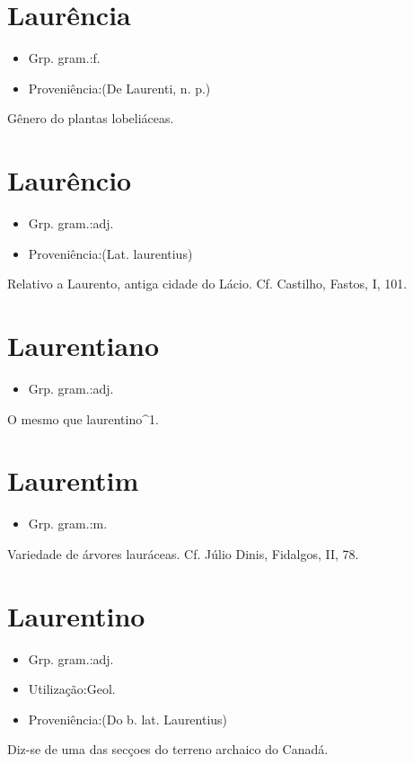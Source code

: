 \section{Laurência}
\begin{itemize}
\item {Grp. gram.:f.}
\end{itemize}
\begin{itemize}
\item {Proveniência:(De \textunderscore Laurenti\textunderscore , n. p.)}
\end{itemize}
Gênero do plantas lobeliáceas.
\section{Laurêncio}
\begin{itemize}
\item {Grp. gram.:adj.}
\end{itemize}
\begin{itemize}
\item {Proveniência:(Lat. \textunderscore laurentius\textunderscore )}
\end{itemize}
Relativo a Laurento, antiga cidade do Lácio. Cf. Castilho, \textunderscore Fastos\textunderscore , I, 101.
\section{Laurentiano}
\begin{itemize}
\item {Grp. gram.:adj.}
\end{itemize}
O mesmo que \textunderscore laurentino\textunderscore ^1.
\section{Laurentim}
\begin{itemize}
\item {Grp. gram.:m.}
\end{itemize}
Variedade de árvores lauráceas. Cf. Júlio Dinis, \textunderscore Fidalgos\textunderscore , II, 78.
\section{Laurentino}
\begin{itemize}
\item {Grp. gram.:adj.}
\end{itemize}
\begin{itemize}
\item {Utilização:Geol.}
\end{itemize}
\begin{itemize}
\item {Proveniência:(Do b. lat. \textunderscore Laurentius\textunderscore )}
\end{itemize}
Diz-se de uma das secçoes do terreno archaico do Canadá.
